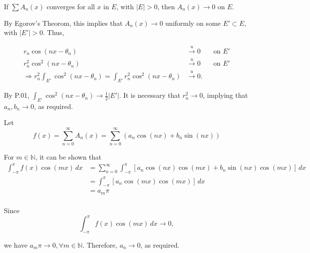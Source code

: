 \documentclass[UTF8,a4paper,10pt]{article}
\begin{document}
If $\sum A_n(x)$ converges for all $x$ in $E$, with \(|E|>0\), then  $A_n(x)\to 0$ on \(E\).

By Egorov's Theorom, this implies that \(A_n(x)\to 0\) uniformly on some \(E'\subset E\), with \(|E'|>0\). Thus,

\begin{align*}
  r_n \cos(nx - \theta_n) &\overset{u}{\to} 0 &&\text{on \(E'\)}\\
  r_n^2 \cos^2(nx - \theta_n) &\overset{u}{\to} 0 &&\text{on \(E'\)}\\
  \Rightarrow r_n^2 \int_{E'}  \cos^2(nx - \theta_n) =  \int_{E'} r_n^2 \cos^2(nx - \theta_n) &\overset{u}{\to} 0.
\end{align*}

By P.01, \(\int_{E'}\cos^2(nx-\theta_n)\to \frac{1}{2}|E'|\). It is necessary that \(r_n^2\to 0\), implying that \(a_n, b_n\to 0\), as required.

\dotfill

Let
\[f(x) = \sum_{n=0}^{\infty}A_n(x) = \sum_{n=0}^{\infty}(a_n \cos (nx) +b_n \sin (nx))\]

For \(m\in \mathbb{N} \), it can be shown that
\begin{align*}
  \int_{-\pi}^{\pi} f(x) \cos(mx) \, dx 
  &= \sum_{n=0}^{\infty}\int_{-\pi}^{\pi}\left[a_n \cos (nx)\cos(mx) + b_n \sin (nx)\cos(mx)\right] \, dx\\
  &= \int_{-\pi}^{\pi}\left[a_n \cos (mx)\cos(mx) \right] \, dx\\
  &= a_m \pi\\
\end{align*}

Since
\[\int_{-\pi}^{\pi} f(x) \cos(mx) \, dx\to 0,\]

we have \(a_m \pi \to 0, \forall m\in \mathbb{N}\). Therefore, \(a_n\to 0\), as required.




\end{document}
